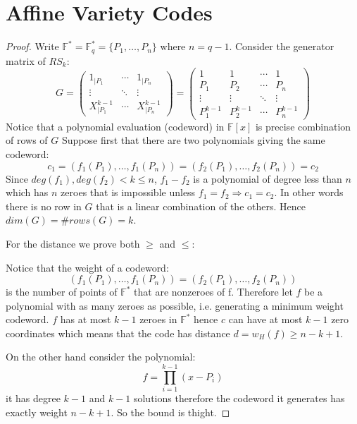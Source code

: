 \documentclass[11pt,a4paper]{report}
\theoremstyle{plain}
\theoremstyle{definition}
\begin{document}
\chapter{Affine Variety Codes}

\begin{thm-hand}[5.1.1]
\end{thm-hand}
\begin{proof}
Write $\mathbb{F}^* = \mathbb{F}_q^* = \{P_1,\ldots, P_n\}$ where $n = q-1$. 
Consider the generator matrix of $RS_k$:
\[
G = \begin{pmatrix}
  1_{|P_1}  & \cdots & 1_{|P_n} \\
  \vdots & \ddots & \vdots  \\
  X_{|P_1}^{k-1}  & \cdots & X_{|P_n}^{k-1} 
 \end{pmatrix} = 
 \begin{pmatrix}
  1  & 1 & \cdots & 1 \\
  P_1 & P_2 & \cdots & P_n\\
  \vdots &\vdots& \ddots & \vdots  \\
  P_1^{k-1} & P_2^{k-1} & \cdots & P_n^{k-1} 
 \end{pmatrix}
\]
Notice that a polynomial evaluation (codeword) in $\mathbb{F}[x]$ is precise combination of rows of $G$
Suppose first that there are two polynomials giving the same codeword:
\[
	c_1 = (f_1(P_1),\ldots, f_1(P_n)) = (f_2(P_1),\ldots, f_2(P_n)) = c_2
\]
Since $deg(f_1),deg(f_2) < k \le n$, $f_1 - f_2$ is a polynomial of degree less than $n$ which has $n$ zeroes that is impossible unless $f_1 = f_2 \Rightarrow c_1 = c_2$. In other words there is no row in $G$ that is a linear combination of the others. Hence $dim(G) = \#rows(G) = k$.

For the distance we prove both $\ge$ and $\le$:

Notice that the weight of a codeword:
\[
	(f_1(P_1),\ldots, f_1(P_n)) = (f_2(P_1),\ldots, f_2(P_n))
\]
	is the number of points of $\mathbb{F}^*$ that are nonzeroes of f. Therefore let $f$ be a polynomial with as many zeroes as possible, i.e. generating a minimum weight codeword. $f$ has at most $k-1$ zeroes in $\mathbb{F}^*$ hence $c$ can have at most $k-1$ zero coordinates which means that the code has distance $d = w_H(f) \ge n - k +1$.

On the other hand consider the polynomial:
\[
	f = \prod\limits_{i = 1}^{k-1}(x - P_i)
\]
it has degree $k-1$ and $k-1$ solutions therefore the codeword it generates has exactly weight $n-k+1$. So the bound is thight.
\end{proof}
\end{document}
